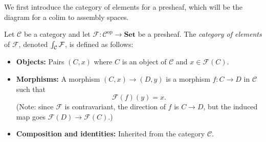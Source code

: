 We first introduce the category of elements for a presheaf, which will be the diagram for a colim to assembly spaces.
\begin{definition}
  Let $\mathcal{C}$ be a category and let $\mathcal{F} : \mathcal{C}^{\mathrm{op}} \to \mathbf{Set}$ be a presheaf. The \emph{category of elements} of $\mathcal{F}$, denoted $\int_{\mathcal{C}} \mathcal{F}$, is defined as follows:

\begin{itemize}
    \item \textbf{Objects:} Pairs $(C, x)$ where $C$ is an object of $\mathcal{C}$ and $x \in \mathcal{F}(C)$.
    \item \textbf{Morphisms:} A morphism $(C, x) \to (D, y)$ is a morphism $f : C \to D$ in $\mathcal{C}$ such that
    \[
    \mathcal{F}(f)(y) = x.
    \]
    (Note: since $\mathcal{F}$ is contravariant, the direction of $f$ is $C \to D$, but the induced map goes $\mathcal{F}(D) \to \mathcal{F}(C)$.)

    \item \textbf{Composition and identities:} Inherited from the category $\mathcal{C}$.
\end{itemize}
\end{definition}

